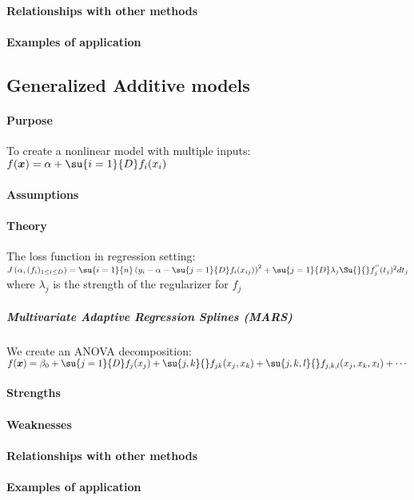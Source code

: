 \paragraph{Relationships with other methods}
\paragraph{Examples of application}

\subsection{Generalized Additive models}
\paragraph{Purpose}
To create a nonlinear model with multiple inputs: $f(\bm{x}) = \alpha + \su{i=1}{D}f_{
i}(x_{i})$
\paragraph{Assumptions}
\paragraph{Theory}
The loss function in regression setting:
$J\left(\alpha,(f_{i})_{1\leq i\leq D}\right) = \su{i=1}{n}\left(y_{i}-\alpha -
\su{j=1}{D}f_{i}(x_{ij})\right)^{2} + \su{j=1}{D}\lambda_{j}\Su{}{}f_{j}^{''}(t_{j})^{
2}dt_{j}$ where $\lambda_{j}$ is the strength of the regularizer for $f_{j}$
\subparagraph{Multivariate Adaptive Regression Splines (MARS)}
We create an ANOVA decomposition:
$f(\bm{x}) = \beta_{0} + \su{j=1}{D}f_{j}(x_{j}) + \su{j,k}{}f_{jk}(x_{j},x_{k}) + 
\su{j,k,l}{}f_{j,k,l}(x_{j}, x_{k}, x_{l}) + \cdots$
\paragraph{Strengths}
\paragraph{Weaknesses}
\paragraph{Relationships with other methods}
\paragraph{Examples of application}

